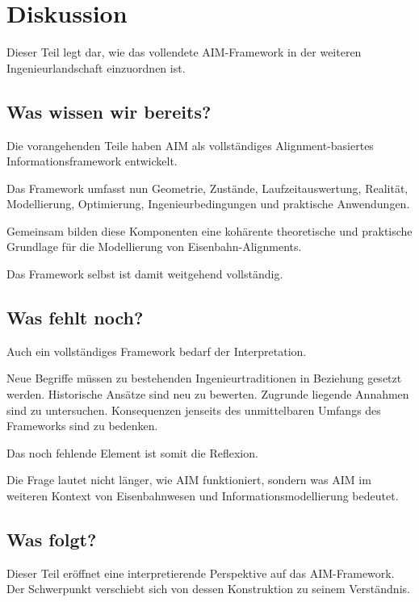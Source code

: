 \chapter*{Diskussion}
{}

Dieser Teil legt dar, wie das vollendete AIM-Framework in der weiteren
Ingenieurlandschaft einzuordnen ist.

\section*{Was wissen wir bereits?}

Die vorangehenden Teile haben AIM als vollständiges Alignment-basiertes
Informationsframework entwickelt.

Das Framework umfasst nun Geometrie, Zustände, Laufzeitauswertung,
Realität, Modellierung, Optimierung, Ingenieurbedingungen und praktische
Anwendungen.

Gemeinsam bilden diese Komponenten eine kohärente theoretische und
praktische Grundlage für die Modellierung von Eisenbahn-Alignments.

Das Framework selbst ist damit weitgehend vollständig.

\section*{Was fehlt noch?}

Auch ein vollständiges Framework bedarf der Interpretation.

Neue Begriffe müssen zu bestehenden Ingenieurtraditionen in Beziehung
gesetzt werden. Historische Ansätze sind neu zu bewerten. Zugrunde
liegende Annahmen sind zu untersuchen. Konsequenzen jenseits des
unmittelbaren Umfangs des Frameworks sind zu bedenken.

Das noch fehlende Element ist somit die Reflexion.

Die Frage lautet nicht länger, wie AIM funktioniert, sondern was AIM im
weiteren Kontext von Eisenbahnwesen und Informationsmodellierung bedeutet.

\section*{Was folgt?}

Dieser Teil eröffnet eine interpretierende Perspektive auf das
AIM-Framework. Der Schwerpunkt verschiebt sich von dessen Konstruktion zu
seinem Verständnis.

